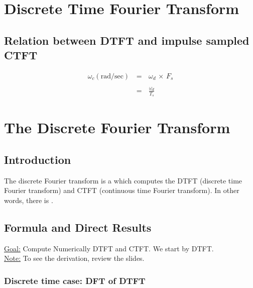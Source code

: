 

\chapter{Discrete Time Fourier Transform}


\section{Relation between DTFT and impulse sampled CTFT}


\begin{equation}
\begin{array}{rcl}
\omega_c \left(\text{rad/sec}\right) \, &=& \, \omega_d \, \times \, F_s \\ \\
&=& \, \displaystyle\frac{\omega_d}{T_s} 
\end{array}
\end{equation}






\chapter{The Discrete Fourier Transform}

\section{Introduction}

The discrete Fourier transform is a  which computes the DTFT (discrete time Fourier transform) and CTFT (continuous time Fourier transform). In other words, there is .


\section{Formula and Direct Results}

\underline{Goal:} Compute Numerically DTFT and CTFT. We start by DTFT.\\

\underline{Note:} To see the derivation, review the slides.


\subsection{Discrete time case: DFT of DTFT}

